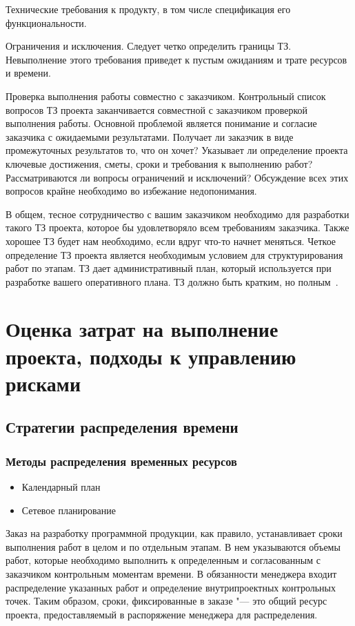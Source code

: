 \documentclass{../industrial-development}
\begin{document}
Технические требования к продукту, в том числе спецификация его функциональности.

Ограничения и исключения. Следует четко определить границы ТЗ. Невыполнение этого требования приведет к пустым ожиданиям и трате ресурсов и времени.

Проверка выполнения работы совместно с заказчиком. Контрольный список вопросов ТЗ проекта заканчивается совместной с заказчиком проверкой выполнения работы. Основной проблемой является понимание и согласие заказчика с ожидаемыми результатами. Получает ли заказчик в виде
промежуточных результатов то, что он хочет? Указывает ли определение проекта ключевые достижения, сметы, сроки и требования к выполнению работ? Рассматриваются ли вопросы ограничений и исключений? Обсуждение всех этих вопросов крайне необходимо во избежание недопонимания.

В общем, тесное сотрудничество с вашим заказчиком необходимо для разработки такого ТЗ проекта, которое бы удовлетворяло всем требованиям заказчика. Также хорошее ТЗ будет нам необходимо, если вдруг что-то начнет меняться. Четкое определение ТЗ проекта является необходимым условием для структурирования работ по этапам. ТЗ дает административный план, который используется при разработке вашего оперативного плана. ТЗ должно быть кратким, но полным~\cite[с.~77--79]{Grey}.

\section{Оценка затрат на выполнение проекта, подходы к управлению рисками}

\subsection{Стратегии распределения времени}

\begin{frame} \frametitle{Методы распределения временных ресурсов}
    \begin{itemize}
     \item Календарный план
     \item Сетевое планирование
    \end{itemize}
\end{frame}

\lecturenotes

Заказ на разработку программной продукции, как правило, устанавливает сроки выполнения работ в целом и по отдельным этапам. В нем указываются объемы работ, которые необходимо выполнить к определенным и согласованным с заказчиком контрольным моментам времени. В обязанности менеджера входит распределение указанных работ и определение внутрипроектных контрольных точек. Таким образом, сроки, фиксированные в заказе "--- это общий ресурс проекта, предоставляемый в распоряжение менеджера для распределения.
\end{document}
